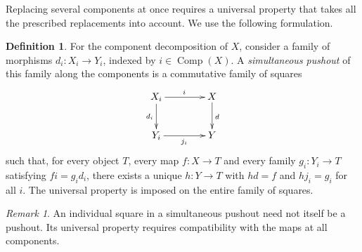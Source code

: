 \documentclass[11pt,a4paper]{article}
\theoremstyle{plain}
\theoremstyle{definition}
\newtheorem{definition}[theorem]{Definition}
\theoremstyle{remark}
\newtheorem{remark}[theorem]{Remark}
\newcommand{\Comp}{\operatorname{Comp}}
\begin{document}
Replacing several components at once requires a universal property
that takes all the prescribed replacements into account. We use the
following formulation.
\begin{definition}
For the component decomposition of $X$, consider a family of
morphisms $d_i:X_i\to Y_i$, indexed by $i\in\Comp(X)$.
A \emph{simultaneous pushout} of this family along the components
is a commutative family of squares
\[
\xymatrix@C=4em@R=2.5em{
X_i \ar[r]^{i} \ar[d]_{d_i} & X \ar[d]^{d} \\
Y_i \ar[r]_{j_i} & Y
}
\]
such that, for every object $T$, every map $f:X\to T$ and every
family $g_i:Y_i\to T$ satisfying $fi=g_id_i$, there exists a unique
$h:Y\to T$ with $hd=f$ and $hj_i=g_i$ for all $i$.
The universal property is imposed on the entire family of squares.
\end{definition}
\begin{remark}
An individual square in a simultaneous pushout need not itself be a
pushout. Its universal property requires compatibility with the maps
at all components.
\end{remark}
\end{document}

